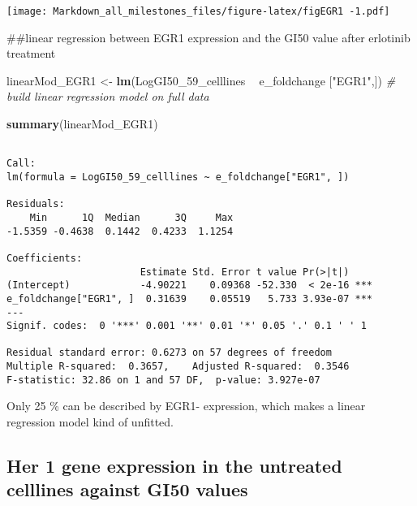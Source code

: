 \documentclass[]{article}
\newenvironment{Shaded}{\begin{snugshade}}{\end{snugshade}}
\newcommand{\CommentTok}[1]{\textcolor[rgb]{0.56,0.35,0.01}{\textit{#1}}}
\newcommand{\DecValTok}[1]{\textcolor[rgb]{0.00,0.00,0.81}{#1}}
\newcommand{\KeywordTok}[1]{\textcolor[rgb]{0.13,0.29,0.53}{\textbf{#1}}}
\newcommand{\NormalTok}[1]{#1}
\newcommand{\OperatorTok}[1]{\textcolor[rgb]{0.81,0.36,0.00}{\textbf{#1}}}
\newcommand{\StringTok}[1]{\textcolor[rgb]{0.31,0.60,0.02}{#1}}
\begin{document}
\texttt{[image: Markdown\_all\_milestones\_files/figure-latex/figEGR1 -1.pdf]}

\#\#linear regression between EGR1 expression and the GI50 value after
erlotinib treatment

\begin{Shaded}
\begin{Highlighting}[]
\NormalTok{linearMod_EGR1 <-}\StringTok{ }\KeywordTok{lm}\NormalTok{(LogGI50_}\DecValTok{59}\NormalTok{_celllines }\OperatorTok{~}\StringTok{ }\NormalTok{e_foldchange [}\StringTok{"EGR1"}\NormalTok{,])  }\CommentTok{# build linear regression model on full data}

\KeywordTok{summary}\NormalTok{(linearMod_EGR1)}
\end{Highlighting}
\end{Shaded}

\begin{verbatim}

Call:
lm(formula = LogGI50_59_celllines ~ e_foldchange["EGR1", ])

Residuals:
    Min      1Q  Median      3Q     Max 
-1.5359 -0.4638  0.1442  0.4233  1.1254 

Coefficients:
                       Estimate Std. Error t value Pr(>|t|)    
(Intercept)            -4.90221    0.09368 -52.330  < 2e-16 ***
e_foldchange["EGR1", ]  0.31639    0.05519   5.733 3.93e-07 ***
---
Signif. codes:  0 '***' 0.001 '**' 0.01 '*' 0.05 '.' 0.1 ' ' 1

Residual standard error: 0.6273 on 57 degrees of freedom
Multiple R-squared:  0.3657,    Adjusted R-squared:  0.3546 
F-statistic: 32.86 on 1 and 57 DF,  p-value: 3.927e-07
\end{verbatim}

Only 25 \% can be described by EGR1- expression, which makes a linear
regression model kind of unfitted.

\hypertarget{her-1-gene-expression-in-the-untreated-celllines-against-gi50-values}{%
\subsection{Her 1 gene expression in the untreated celllines against
GI50
values}\label{her-1-gene-expression-in-the-untreated-celllines-against-gi50-values}}
\end{document}
